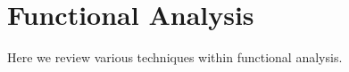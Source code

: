 \newpage
\chapter{Functional Analysis}
\label{app:func-analysis}
Here we review various techniques within functional analysis.

